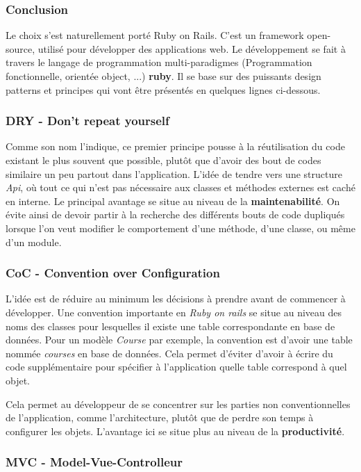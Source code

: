 \subsubsection{Conclusion}
Le choix s'est naturellement porté Ruby on Rails. C'est un framework open-source, utilisé pour développer des applications web. Le développement se fait à travers le langage de programmation multi-paradigmes (Programmation fonctionnelle, orientée object, ...) \textbf{ruby}. Il se base sur des puissants design patterns et principes qui vont être présentés en quelques lignes ci-dessous.

\subsubsection{DRY - Don't repeat yourself}
Comme son nom l'indique, ce premier principe pousse à la réutilisation du code existant le plus souvent que possible, plutôt que d'avoir des bout de codes similaire un peu partout dans l'application. L'idée de tendre vers une structure \textit{Api}, où tout ce qui n'est pas nécessaire aux classes et méthodes externes est caché en interne. Le principal avantage se situe au niveau de la \textbf{maintenabilité}. On évite ainsi de devoir partir à la recherche des différents bouts de code dupliqués lorsque l'on veut modifier le comportement d'une méthode, d'une classe, ou même d'un module.

\subsubsection{CoC - Convention over Configuration}
L'idée est de réduire au minimum les décisions à prendre avant de commencer à développer. Une convention importante en \textit{Ruby on rails} se situe au niveau des noms des classes pour lesquelles il existe une table correspondante en base de données. Pour un modèle \textit{Course} par exemple, la convention est d'avoir une table nommée \textit{courses} en base de données. Cela permet d'éviter d'avoir à écrire du code supplémentaire pour spécifier à l'application quelle table correspond à quel objet. 

Cela permet au développeur de se concentrer sur les parties non conventionnelles de l'application, comme l'architecture, plutôt que de perdre son temps à configurer les objets. L'avantage ici se situe plus au niveau de la \textbf{productivité}.
\subsubsection{MVC - Model-Vue-Controlleur}

